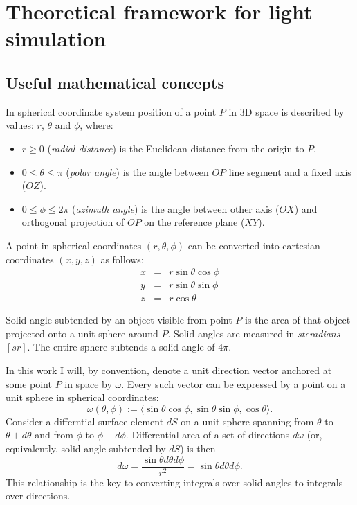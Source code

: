 \chapter{Theoretical framework for light simulation}

\section{Useful mathematical concepts}

\begin{df}
In spherical coordinate system position of a point $P$ in 3D space is described by values: $r$, $\theta$ and $\phi$, where:
\begin{itemize}
\item $r \geq 0$ (\emph{radial distance}) is the Euclidean distance from the origin to $P$.
\item $0 \leq \theta \leq \pi$ (\emph{polar angle}) is the angle between $OP$ line segment and a fixed axis ($OZ$).
\item $0 \leq \phi \leq 2\pi$ (\emph{azimuth angle}) is the angle between other axis ($OX$) and orthogonal projection of $OP$ on the reference plane ($XY$).
\end{itemize}
A point in spherical coordinates $(r, \theta, \phi)$ can be converted into cartesian coordinates $(x, y, z)$ as follows:
\begin{eqnarray}
  x &=& r \sin \theta \cos \phi \nonumber \\
  y &=& r \sin \theta \sin \phi \\
  z &=& r \cos \theta \nonumber
\end{eqnarray}
\end{df}

\begin{df}
Solid angle subtended by an object visible from point $P$ is the area of that object projected onto a unit sphere around $P$. Solid angles are measured in \emph{steradians} $[sr]$. The entire sphere subtends a solid angle of $4\pi$.
\end{df}

In this work I will, by convention, denote a unit direction vector anchored at some point $P$ in space by $\omega$. Every such vector can be expressed by a point on a unit sphere in spherical coordinates:
\begin{equation}
  \omega(\theta,\phi) := \langle \sin\theta\cos\phi, \sin\theta\sin\phi, \cos\theta \rangle.
\end{equation}
Consider a differntial surface element $dS$ on a unit sphere spanning from $\theta$ to $\theta + d\theta$ and from $\phi$ to $\phi + d\phi$. Differential area of a set of directions $d\omega$ (or, equivalently, solid angle subtended by $dS$) is then
\begin{equation}
\label{eq:dw2spherical}
  d\omega = \frac{\sin\theta d\theta d\phi}{r^{2}} = \sin\theta d\theta d\phi.
\end{equation}
This relationship is the key to converting integrals over solid angles to integrals over directions.

